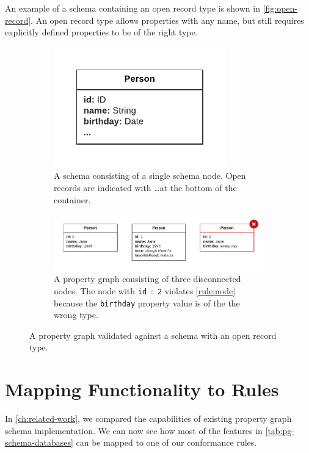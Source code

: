 \documentclass{report}
\theoremstyle{definition}
\begin{document}
An example of a schema containing an open record type is shown in \autoref{fig:open-record}. An open record type allows properties with any name, but still requires explicitly defined properties to be of the right type.

\begin{figure}[t]
  \centering
  \begin{subfigure}[t]{0.8\textwidth}
    \centering
    \includegraphics[scale=0.75]{figures/pg-schema-open-record.pdf}
    \caption{A schema consisting of a single schema node. Open records are indicated with \ldots at the bottom of the container.}
  \end{subfigure}
  \hfill
  \begin{subfigure}[t]{0.8\textwidth}
    \centering
    \includegraphics[scale=0.75]{figures/conformance-open-record.pdf}
    \caption{A property graph consisting of three disconnected nodes. The node with \texttt{id}~:~\texttt{2} violates \autoref{rule:node} because the \texttt{birthday} property value is of the the wrong type.}
  \end{subfigure}
  \caption[A property graph validated against a schema with an open record type]{A property graph validated against a schema with an open record type.}
  \label{fig:open-record}
\end{figure}

\section{Mapping Functionality to Rules}

In \autoref{ch:related-work}, we compared the capabilities of existing property graph schema implementation. We can now see how most of the features in \autoref{tab:pg-schema-databases} can be mapped to one of our conformance rules.
\end{document}
